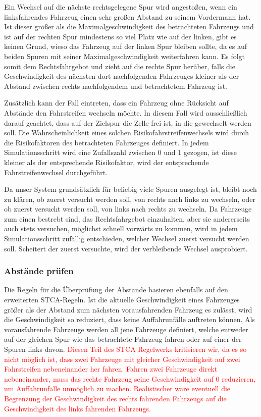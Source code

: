 \documentclass[11pt, a4paper]{article}
\begin{document}
Ein Wechsel auf die nächste rechtsgelegene Spur wird angestoßen, wenn ein linksfahrendes Fahrzeug einen sehr großen Abstand zu seinem Vordermann hat. Ist dieser größer als die Maximalgeschwindigkeit des betrachteten Fahrzeugs und ist auf der rechten Spur mindestens so viel Platz wie auf der linken, gibt es keinen Grund, wieso das Fahrzeug auf der linken Spur bleiben sollte, da es auf beiden Spuren mit seiner Maximalgeschwindigkeit weiterfahren kann. Es folgt somit dem Rechtsfahrgebot und zieht auf die rechte Spur herüber, falls die Geschwindigkeit des nächsten dort nachfolgenden Fahrzeuges kleiner als der Abstand zwischen rechts nachfolgendem und betrachtetem Fahrzeug ist.

Zusätzlich kann der Fall eintreten, dass ein Fahrzeug ohne Rücksicht auf Abstände den Fahrstreifen wechseln möchte. In diesem Fall wird ausschließlich darauf geachtet, dass auf der Zielspur die Zelle frei ist, in die gewechselt werden soll. Die Wahrscheinlichkeit eines solchen Risikofahrstreifenwechsels wird durch die Risikofaktoren des betrachteten Fahrzeuges definiert. In jedem Simulationsschritt wird eine Zufallszahl zwischen 0 und 1 gezogen, ist diese kleiner als der entsprechende Risikofaktor, wird der entsprechende Fahrstreifenwechsel durchgeführt.

Da unser System grundsätzlich für beliebig viele Spuren ausgelegt ist, bleibt noch zu klären, ob zuerst versucht werden soll, von rechts nach links zu wechseln, oder ob zuerst versucht werden soll, von links nach rechts zu wechseln. Da Fahrzeuge zum einen bestrebt sind, das Rechtsfahrgebot einzuhalten, aber sie andererseits auch stets versuchen, möglichst schnell vorwärts zu kommen, wird in jedem Simulationsschritt zufällig entschieden, welcher Wechsel zuerst versucht werden soll. Scheitert der zuerst versuchte, wird der verbleibende Wechsel ausprobiert.

\subsubsection{Abstände prüfen}
\label{subsubsec:abstaendePruefen}

Die Regeln für die Überprüfung der Abstande basieren ebenfalls auf den erweiterten STCA-Regeln. Ist die aktuelle Geschwindigkeit eines Fahrzeuges größer als der Abstand zum nächsten vorausfahrenden Fahrzeug es zulässt, wird die Geschwindigkeit so reduziert, dass keine Auffahrunfälle auftreten können. Als vorausfahrende Fahrzeuge werden all jene Fahrzeuge definiert, welche entweder auf der gleichen Spur wie das betrachtete Fahrzeug fahren oder auf einer der Spuren links davon. \textcolor{red}{Diesen Teil des STCA Regelwerks kritisieren wir, da es so nicht möglich ist, dass zwei Fahrzeuge mit gleicher Geschwindigkeit auf zwei Fahrstreifen nebeneinander her fahren. Fahren zwei Fahrzeuge direkt nebeneinander, muss das rechte Fahrzeug seine Geschwindigkeit auf 0 reduzieren, um Auffahrunfälle unmöglich zu machen. Realistischer wäre eventuell die Begrenzung der Geschwindigkeit des rechts fahrenden Fahrzeugs auf die Geschwindigkeit des links fahrenden Fahrzeugs.}
\end{document}

